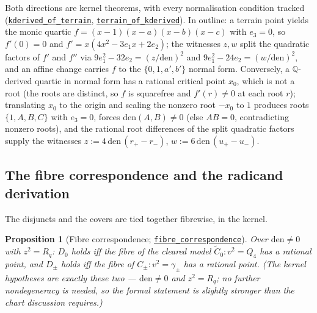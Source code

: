 \documentclass[11pt]{amsart}
\newtheorem{proposition}[theorem]{Proposition}
\newcommand{\Q}{\mathbb{Q}}
\newcommand{\repourl}{https://github.com/hirokifukui/rd-quartics-classification}
\newcommand{\repotag}{v1.1.0}
\newcommand{\leanline}[3]{\href{\repourl/blob/\repotag/#1\#L#2}{\texttt{#3}}}
\begin{document}
Both directions are kernel theorems, with every normalisation
condition tracked
(\leanline{Gap/BMThm7Terrain.lean}{124}{kderived\_of\_terrain},
\leanline{Gap/BMThm7Terrain.lean}{223}{terrain\_of\_kderived}).  In
outline: a terrain point yields the monic quartic
$f=(x-1)(x-a)(x-b)(x-c)$ with $e_{3}=0$, so $f'(0)=0$ and
$f'=x(4x^{2}-3e_{1}x+2e_{2})$; the witnesses $z,w$ split the quadratic
factors of $f'$ and $f''$ via
$9e_{1}^{2}-32e_{2}=(z/\mathrm{den})^{2}$ and
$9e_{1}^{2}-24e_{2}=(w/\mathrm{den})^{2}$, and an affine change carries
$f$ to the $\{0,1,a',b'\}$ normal form.  Conversely, a $\Q$-derived
quartic in normal form has a rational critical point $x_{0}$, which is
not a root (the roots are distinct, so $f$ is squarefree and
$f'(r)\neq0$ at each root $r$); translating $x_{0}$ to the origin and
scaling the nonzero root $-x_{0}$ to $1$ produces roots $\{1,A,B,C\}$
with $e_{3}=0$, forces $\mathrm{den}(A,B)\neq0$ (else $AB=0$,
contradicting nonzero roots), and the rational root differences of the
split quadratic factors supply the witnesses
$z:=4\,\mathrm{den}\,(r_{+}-r_{-})$,
$w:=6\,\mathrm{den}\,(u_{+}-u_{-})$.

\subsection{The fibre correspondence and the radicand derivation}
\label{sec:boundary:fibre}

The disjuncts and the covers are tied together fibrewise, in the
kernel.

\begin{proposition}[Fibre correspondence;
\leanline{Gap/BMThm7Fibre.lean}{293}{fibre\_correspondence}]
\label{prop:fibre}
Over $\mathrm{den}\neq0$ with $z^{2}=R_{q}$: $D_{0}$ holds iff the
fibre of the cleared model $\widetilde C_{0}\colon v^{2}=Q_{4}$ has a
rational point, and $D_{\pm}$ holds iff the fibre of
$C_{\pm}\colon v^{2}=\gamma_{\pm}$ has a rational point.  (The kernel
hypotheses are exactly these two --- $\mathrm{den}\neq0$ and
$z^{2}=R_{q}$; no further nondegeneracy is needed, so the formal
statement is slightly stronger than the chart discussion requires.)
\end{proposition}
\end{document}
